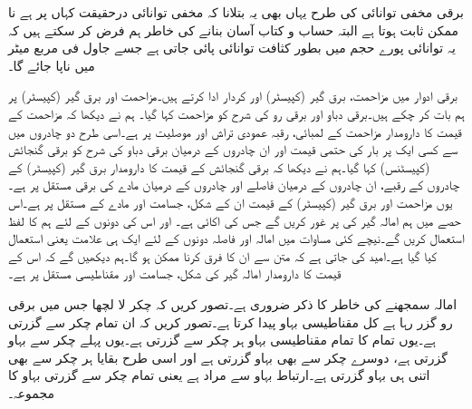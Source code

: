 برقی مخفی توانائی کی طرح یہاں بھی یہ بتلانا کہ مخفی توانائی درحقیقت کہاں پر ہے نا ممکن ثابت ہوتا ہے البتہ حساب و کتاب آسان بنانے کی خاطر ہم فرض کر سکتے ہیں کہ یہ توانائی پورے حجم میں بطور کثافت توانائی  پائی جاتی ہے جسے جاول فی مربع میٹر  میں ناپا جائے گا۔


برقی ادوار میں مزاحمت، برق گیر (کپیسٹر) اور  کردار ادا کرتے ہیں۔مزاحمت اور برق گیر (کپیسٹر) پر ہم بات کر چکے ہیں۔برقی دباو اور برقی رو کی شرح کو مزاحمت کہا گیا۔ ہم نے دیکھا کہ مزاحمت کے قیمت کا دارومدار مزاحمت کے لمبائی، رقبہ عمودی تراش اور موصلیت پر ہے۔اسی طرح دو چادروں میں سے کسی ایک پر بار کی حتمی قیمت اور ان چادروں  کے درمیان برقی دباو کی شرح کو برقی گنجائش (کپیسٹنس) کہا گیا۔ہم نے دیکھا کہ برقی گنجائش کے قیمت کا دارومدار برق گیر (کپیسٹر) کے چادروں کے رقبے، ان چادروں کے درمیان فاصلے اور چادروں کے درمیان مادے کی برقی مستقل پر ہے۔یوں مزاحمت اور برق گیر (کپیسٹر) کے قیمت ان کے شکل، جسامت اور مادے کے مستقل پر ہے۔اس حصے میں ہم امالہ گیر کی   پر غور کریں گے جس کی اکائی   ہے۔ اور اس کی  دونوں کے لئے ہم  کا لفظ استعمال کریں گے۔نیچے کئی مساوات میں امالہ اور فاصلہ دونوں کے لئے ایک ہی علامت یعنی  استعمال کیا گیا ہے۔امید کی جاتی ہے کہ متن سے ان کا فرق کرنا ممکن ہو گا۔ہم دیکھیں گے کہ اس کے قیمت کا دارومدار امالہ گیر کی شکل، جسامت اور مقناطیسی مستقل پر ہے۔ 

امالہ سمجھنے کی خاطر  کا ذکر ضروری ہے۔تصور کریں کہ  چکر لا لچھا جس میں  برقی رو گزر رہا ہے کل  مقناطیسی بہاو پیدا کرتا ہے۔تصور کریں کہ  ان تمام  چکر سے گزرتی ہے۔یوں تمام کا تمام مقناطیسی بہاو ہر چکر سے گزرتی ہے۔یوں پہلے چکر سے  بہاو گزرتی ہے، دوسرے چکر سے بھی  بہاو گزرتی ہے اور اسی طرح بقایا ہر چکر سے بھی اتنی ہی بہاو گزرتی ہے۔ارتباط بہاو سے مراد  ہے یعنی تمام چکر سے گزرتی بہاو کا مجموعہ۔

